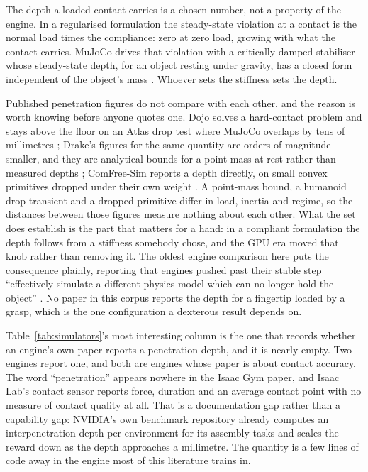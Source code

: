 The depth a loaded contact carries is a chosen number, not a property of the engine. In a
regularised formulation the steady-state violation at a contact is the normal load times the
compliance: zero at zero load, growing with what the contact carries. MuJoCo drives that
violation with a critically damped stabiliser whose steady-state depth, for an object resting
under gravity, has a closed form independent of the object's mass
\cite[Sec.~V]{mujoco_convex_contact_2014}. Whoever sets the stiffness sets the depth.

Published penetration figures do not compare with each other, and the reason is worth knowing
before anyone quotes one. Dojo solves a hard-contact problem and stays above the floor on an
Atlas drop test where MuJoCo overlaps by tens of millimetres \cite[Sec.~V-A]{dojo_2022}; Drake's
figures for the same quantity are orders of magnitude smaller, and they are analytical bounds for
a point mass at rest rather than measured depths \cite[Sec.~V-B]{castro_sap_contact_2021};
ComFree-Sim reports a depth directly, on small convex primitives dropped under their own weight
\cite[Sec.~IV-A]{comfree_sim_2026}. A point-mass bound, a humanoid drop transient and a dropped
primitive differ in load, inertia and regime, so the distances between those figures measure
nothing about each other. What the set does establish is the part that matters for a hand: in a
compliant formulation the depth follows from a stiffness somebody chose, and the GPU era moved
that knob rather than removing it. The oldest engine comparison here puts the consequence
plainly, reporting that engines pushed past their stable step ``effectively simulate a different
physics model which can no longer hold the object''
\cite[Sec.~IV-D]{physics_engine_comparison_2015}. No paper in this corpus reports the depth for a
fingertip loaded by a grasp, which is the one configuration a dexterous result depends on.

Table~\ref{tab:simulators}'s most interesting column is the one that records whether an engine's
own paper reports a penetration depth, and it is nearly empty. Two engines report one, and both
are engines whose paper is about contact accuracy. The word ``penetration'' appears nowhere in
the Isaac Gym paper, and Isaac Lab's contact sensor reports force, duration and an average
contact point with no measure of contact quality at all. That is a documentation gap rather than
a capability gap: NVIDIA's own benchmark repository already computes an interpenetration depth
per environment for its assembly tasks and scales the reward down as the depth approaches a
millimetre. The quantity is a few lines of code away in the engine most of this literature
trains in.

